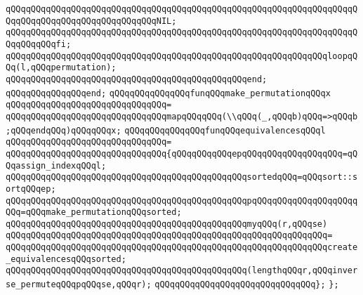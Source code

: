 \verb|qQQqqQQqqQQqqQQqqQQqqQQqqQQqqQQqqQQqqQQqqQQqqQQqqQQqqQQqqQQqqQQqqQQqqQQqqQQqqQQqqQQqqQQqqQQqqQQqqQQqNIL;|\newline
\verb|qQQqqQQqqQQqqQQqqQQqqQQqqQQqqQQqqQQqqQQqqQQqqQQqqQQqqQQqqQQqqQQqqQQqqQQqqQQqqQQqfi;|\newline
\newline
\verb|qQQqqQQqqQQqqQQqqQQqqQQqqQQqqQQqqQQqqQQqqQQqqQQqqQQqqQQqqQQqqQQqloopqQQq(l,qQQqpermutation);|\newline
\verb|qQQqqQQqqQQqqQQqqQQqqQQqqQQqqQQqqQQqqQQqqQQqqQQqend;|\newline
\verb|qQQqqQQqqQQqqQQqend;|\newline
\newline
\verb|qQQqqQQqqQQqqQQqfunqQQqmake_permutationqQQqx|\newline
\verb|qQQqqQQqqQQqqQQqqQQqqQQqqQQqqQQq=|\newline
\verb|qQQqqQQqqQQqqQQqqQQqqQQqqQQqqQQqmapqQQqqQQq(\\qQQq(_,qQQqb)qQQq=>qQQqb;qQQqendqQQq)qQQqqQQqx;|\newline
\newline
\verb|qQQqqQQqqQQqqQQqfunqQQqequivalencesqQQql|\newline
\verb|qQQqqQQqqQQqqQQqqQQqqQQqqQQqqQQq=|\newline
\verb|qQQqqQQqqQQqqQQqqQQqqQQqqQQqqQQq{qQQqqQQqqQQqepqQQqqQQqqQQqqQQqqQQq=qQQqassign_indexqQQql;|\newline
\verb|qQQqqQQqqQQqqQQqqQQqqQQqqQQqqQQqqQQqqQQqqQQqqQQqsortedqQQq=qQQqsort::sortqQQqep;|\newline
\verb|qQQqqQQqqQQqqQQqqQQqqQQqqQQqqQQqqQQqqQQqqQQqqQQqpqQQqqQQqqQQqqQQqqQQqqQQq=qQQqmake_permutationqQQqsorted;|\newline
\newline
\verb|qQQqqQQqqQQqqQQqqQQqqQQqqQQqqQQqqQQqqQQqqQQqqQQqmyqQQq(r,qQQqse)|\newline
\verb|qQQqqQQqqQQqqQQqqQQqqQQqqQQqqQQqqQQqqQQqqQQqqQQqqQQqqQQqqQQqqQQq=|\newline
\verb|qQQqqQQqqQQqqQQqqQQqqQQqqQQqqQQqqQQqqQQqqQQqqQQqqQQqqQQqqQQqqQQqcreate_equivalencesqQQqsorted;|\newline
\newline
\verb|qQQqqQQqqQQqqQQqqQQqqQQqqQQqqQQqqQQqqQQqqQQqqQQq(lengthqQQqr,qQQqinverse_permuteqQQqpqQQqse,qQQqr);|\newline
\verb|qQQqqQQqqQQqqQQqqQQqqQQqqQQqqQQq};|\newline
\verb|};|\newline
\newline
